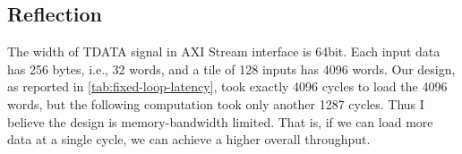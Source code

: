 \subsection{Reflection}
\label{sec:reflection}

The width of TDATA signal in AXI Stream interface is 64bit.
Each input data has 256 bytes, i.e., 32 words, and a tile of 128 inputs has 4096 words.
Our design, as reported in \autoref{tab:fixed-loop-latency}, took exactly 4096 cycles to load the 4096 words, but the following computation took only another 1287 cycles.
Thus I believe the design is memory-bandwidth limited.
That is, if we can load more data at a single cycle, we can achieve a higher overall throughput.

